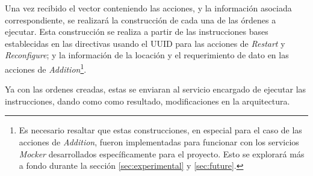 Una vez recibido el vector conteniendo las acciones, y la información asociada correspondiente, se realizará la construcción de cada una de las órdenes a ejecutar. Esta construcción se realiza a partir de las instrucciones bases establecidas en las directivas usando el UUID para las acciones de \textit{Restart} y \textit{Reconfigure}; y la información de la locación y el requerimiento de dato en las acciones de \textit{Addition}\footnote{Es necesario resaltar que estas construcciones, en especial para el caso de las acciones de \textit{Addition}, fueron implementadas para funcionar con los servicios \textit{Mocker} desarrollados específicamente para el proyecto. Esto se explorará más a fondo durante la sección \ref{sec:experimental} y \ref{sec:future}.}. 

Ya con las ordenes creadas, estas se enviaran al servicio encargado de ejecutar las instrucciones, dando como como resultado, modificaciones en la arquitectura.
